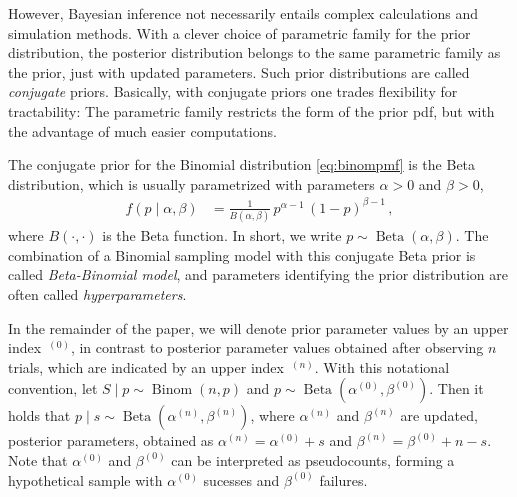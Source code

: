 \documentclass[runningheads,a4paper]{llncs}
\newcommand{\uz}{^{(0)}} %
\newcommand{\un}{^{(n)}} %
\newcommand{\az}{\alpha\uz}
\newcommand{\an}{\alpha\un}
\newcommand{\bz}{\beta\uz}
\newcommand{\bn}{\beta\un}
\newcommand{\bin}{\operatorname{Binom}} %
\newcommand{\be}{\operatorname{Beta}}   %
\begin{document}
However, Bayesian inference not necessarily entails complex calculations and simulation methods.
With a clever choice of parametric family for the prior distribution,
the posterior distribution belongs to the same parametric family as the prior, just with updated parameters.
Such prior distributions are called \emph{conjugate} priors.
Basically, with conjugate priors one trades flexibility for tractability:
The parametric family restricts the form of the prior pdf,
but with the advantage of much easier computations.

The conjugate prior for the Binomial distribution \eqref{eq:binompmf} is the Beta distribution,
which is usually parametrized with parameters $\alpha > 0$ and $\beta > 0$,
\begin{align}
f(p\mid\alpha,\beta) &= \frac{1}{B(\alpha,\beta)}\, p^{\alpha-1}\, (1-p)^{\beta-1}\,,
\label{eq:betadensab}
\end{align}
where $B(\cdot,\cdot)$ is the Beta function.
In short, we write $p \sim \be(\alpha,\beta)$.
The combination of a Binomial sampling model with this conjugate Beta prior is called \emph{Beta-Binomial model},
and parameters identifying the prior distribution are often called \emph{hyperparameters}.

In the remainder of the paper, we will denote prior parameter values by an upper index~${}\uz$,
in contrast to posterior parameter values obtained after observing $n$ trials,
which are indicated by an upper index~${}\un$.
With this notational convention,
let $S\mid p \sim \bin(n,p)$ and $p \sim \be(\az,\bz)$.
Then it holds that $p \mid s \sim \be(\an,\bn)$,
where $\an$ and $\bn$ are updated, posterior parameters, obtained as
$\an = \az + s$ and $\bn= \bz + n - s$.
Note that $\az$ and $\bz$ can be interpreted as pseudocounts,
forming a hypothetical sample with $\az$ sucesses and $\bz$ failures.
\end{document}
